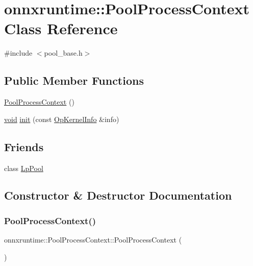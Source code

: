 \hypertarget{classonnxruntime_1_1PoolProcessContext}{}\section{onnxruntime\+:\+:Pool\+Process\+Context Class Reference}
\label{classonnxruntime_1_1PoolProcessContext}


{\ttfamily \#include $<$pool\+\_\+base.\+h$>$}

\subsection*{Public Member Functions}
\begin{DoxyCompactItemize}
\item 
\mbox{\hyperlink{classonnxruntime_1_1PoolProcessContext_ab9d08d6f326ff6bddf9c9eb4b39671fc}{Pool\+Process\+Context}} ()
\item 
\mbox{\hyperlink{mlasi_8h_a88f941d423cb2a819b70a1358982b1a6}{void}} \mbox{\hyperlink{classonnxruntime_1_1PoolProcessContext_a75d5293a62f4339dd6d5465e65d9bba7}{init}} (const \mbox{\hyperlink{classonnxruntime_1_1OpKernelInfo}{Op\+Kernel\+Info}} \&info)
\end{DoxyCompactItemize}
\subsection*{Friends}
\begin{DoxyCompactItemize}
\item 
class \mbox{\hyperlink{classonnxruntime_1_1PoolProcessContext_ad1a23cb95ca49d58d971e65541581aa9}{Lp\+Pool}}
\end{DoxyCompactItemize}


\subsection{Constructor \& Destructor Documentation}
\mbox{\label{classonnxruntime_1_1PoolProcessContext_ab9d08d6f326ff6bddf9c9eb4b39671fc}} 
\subsubsection{\texorpdfstring{Pool\+Process\+Context()}{PoolProcessContext()}}
{\footnotesize\ttfamily onnxruntime\+::\+Pool\+Process\+Context\+::\+Pool\+Process\+Context (\begin{DoxyParamCaption}{ }\end{DoxyParamCaption})\hspace{0.3cm}{\ttfamily [inline]}}



